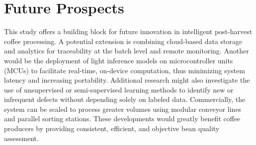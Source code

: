 \section{Future Prospects}
This study offers a building block for future innovation in intelligent post-harvest coffee processing. A potential extension is combining cloud-based data storage and analytics for traceability at the batch level and remote monitoring. Another would be the deployment of light inference models on microcontroller units (MCUs) to facilitate real-time, on-device computation, thus minimizing system latency and increasing portability. Additional research might also investigate the use of unsupervised or semi-supervised learning methods to identify new or infrequent defects without depending solely on labeled data. Commercially, the system can be scaled to process greater volumes using modular conveyor lines and parallel sorting stations. These developments would greatly benefit coffee producers by providing consistent, efficient, and objective bean quality assessment.
